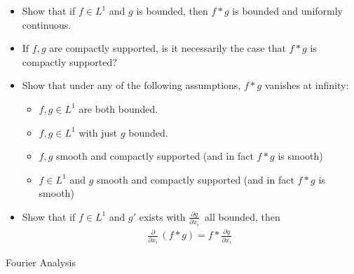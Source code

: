 \begin{itemize}
\tightlist
\item
  Show that if \(f\in L^1\) and \(g\) is bounded, then \(f\ast g\) is
  bounded and uniformly continuous.
\item
  If \(f, g\) are compactly supported, is it necessarily the case that
  \(f\ast g\) is compactly supported?
\item
  Show that under any of the following assumptions, \(f\ast g\) vanishes
  at infinity:

  \begin{itemize}
  \tightlist
  \item
    \(f, g\in L^1\) are both bounded.
  \item
    \(f, g\in L^1\) with just \(g\) bounded.
  \item
    \(f, g\) smooth and compactly supported (and in fact \(f\ast g\) is
    smooth)
  \item
    \(f\in L^1\) and \(g\) smooth and compactly supported (and in fact
    \(f\ast g\) is smooth)
  \end{itemize}
\item
  Show that if \(f\in L^1\) and \(g'\) exists with
  \({\frac{\partial g}{\partial x_i}\,}\) all bounded, then
  \begin{align*}{\frac{\partial }{\partial x_i}\,}(f\ast g) = f \ast {\frac{\partial g}{\partial x_i}\,}\end{align*}
\end{itemize}

Fourier Analysis

